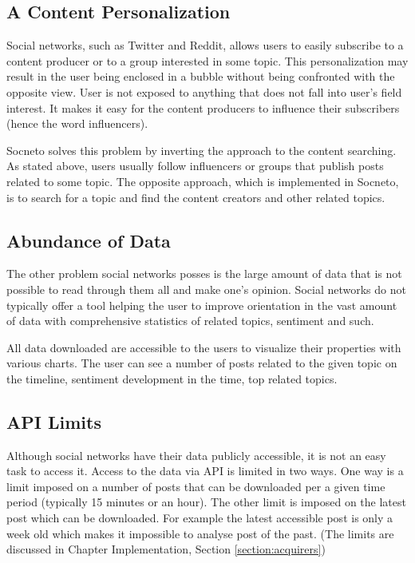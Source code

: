 \subsection{A Content Personalization}

Social networks, such as Twitter and Reddit, allows users to easily subscribe to a content producer or to a group interested in some topic. This personalization may result in the user being enclosed in a bubble without being confronted with the opposite view. User is not exposed to anything that does not fall into user's field interest. It makes it easy for the content producers to influence their subscribers (hence the word influencers).

Socneto solves this problem by inverting the approach to the content searching. As stated above, users usually follow influencers or groups that publish posts related to some topic. The opposite approach, which is implemented in Socneto, is to search for a topic and find the content creators and other related topics.

\subsection{Abundance of Data}

The other problem social networks posses is the large amount of data that is not possible to read through them all and make one's opinion. Social networks do not typically offer a tool helping the user to improve orientation in the vast amount of data with comprehensive statistics of related topics, sentiment and such.

All data downloaded are accessible to the users to visualize their properties with various charts. The user can see a number of posts related to the given topic on the timeline, sentiment development in the time, top related topics.

\subsection{API Limits}

Although social networks have their data publicly accessible, it is not an easy task to access it. Access to the data via API is limited in two ways. One way is a limit imposed on a number of posts that can be downloaded per a given time period (typically 15 minutes or an hour).  The other limit is imposed on the latest post which can be downloaded. For example the latest accessible post is only a week old which makes it impossible to analyse post of the past. (The limits are discussed in Chapter Implementation, Section \ref{section:acquirers}) 

